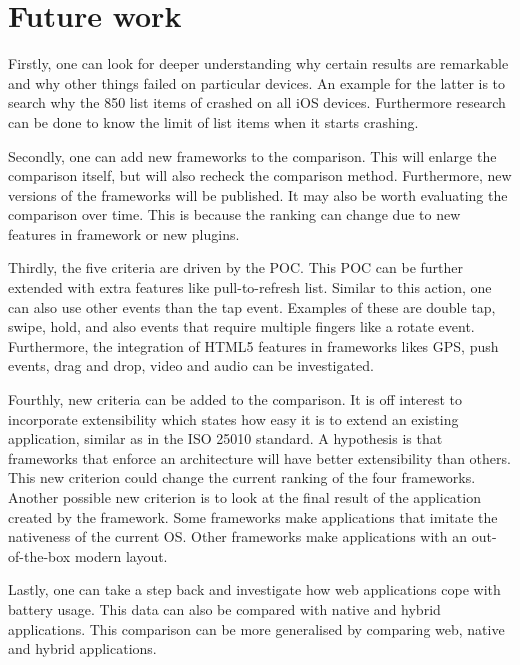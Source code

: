 \documentclass[a4paper]{artikel3}
\begin{document}

\section{Future work} %
\label{sec:future_work}
Firstly, one can look for deeper understanding why certain results are remarkable and why other things failed on particular devices.
An example for the latter is to search why the 850 list items of \kendoa{} crashed on all iOS devices.
Furthermore research can be done to know the limit of list items when it starts crashing.

Secondly, one can add new frameworks to the comparison.
This will enlarge the comparison itself, but will also recheck the comparison method.
Furthermore, new versions of the frameworks will be published.
It may also be worth evaluating the comparison over time.
This is because the ranking can change due to new features in framework or new plugins.

Thirdly, the five criteria are driven by the POC.
This POC can be further extended with extra features like pull-to-refresh list.
Similar to this action, one can also use other events than the tap event.
Examples of these are double tap, swipe, hold, and also events that require multiple fingers like a rotate event.
Furthermore, the integration of HTML5 features in frameworks likes GPS, push events, drag and drop, video and audio can be investigated.

Fourthly, new criteria can be added to the comparison.
It is off interest to incorporate extensibility which states how easy it is to extend an existing application, similar as in the ISO 25010 standard.
A hypothesis is that frameworks that enforce an architecture will have better extensibility than others.
This new criterion could change the current ranking of the four frameworks.
Another possible new criterion is to look at the final result of the application created by the framework.
Some frameworks make applications that imitate the nativeness of the current OS.
Other frameworks make applications with an out-of-the-box modern layout.

Lastly, one can take a step back and investigate how web applications cope with battery usage.
This data can also be compared with native and hybrid applications.
This comparison can be more generalised by comparing web, native and hybrid applications.
\end{document}
